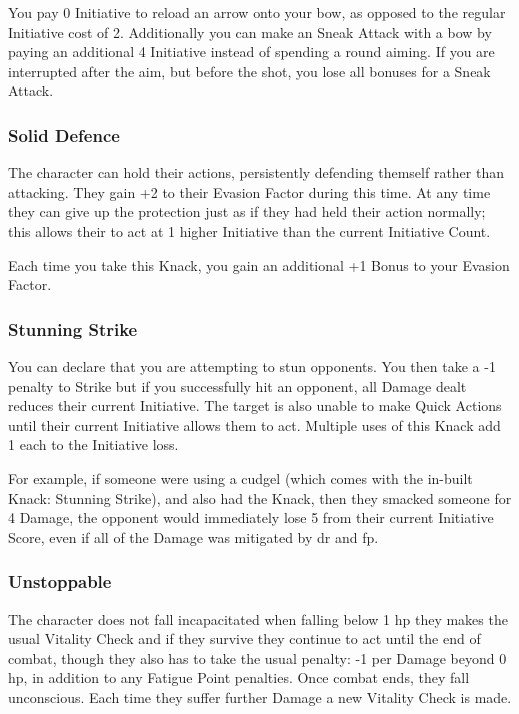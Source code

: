 \begin{multicols}{2}
You pay 0 Initiative to reload an arrow onto your bow, as opposed to the regular Initiative cost of 2.
Additionally you can make an Sneak Attack with a bow by paying an additional 4 Initiative instead of spending a \gls{round} aiming.
If you are interrupted after the aim, but before the shot, you lose all bonuses for a Sneak Attack.

\subsubsection{Solid Defence}\label{soliddefence}

The character can hold their actions, persistently defending themself rather than attacking. They gain +2 to their Evasion Factor during this time. At any time they can give up the protection just as if they had held their action normally; this allows their to act at 1 higher Initiative than the current Initiative Count.

Each time you take this Knack, you gain an additional +1 Bonus to your Evasion Factor.

\subsubsection{Stunning Strike}\label{stunningstrike}

You can declare that you are attempting to stun opponents.
You then take a -1 penalty to Strike but if you successfully hit an opponent, all Damage dealt reduces their current Initiative.
The target is also unable to make Quick Actions until their current Initiative allows them to act.
Multiple uses of this Knack add 1 each to the Initiative loss.

For example, if someone were using a cudgel (which comes with the in-built Knack: Stunning Strike), and also had the Knack, then they smacked someone for 4 Damage, the opponent would immediately lose 5 from their current Initiative Score, even if all of the Damage was mitigated by \gls{dr} and \gls{fp}.

\subsubsection{Unstoppable}

The character does not fall incapacitated when falling below 1 \gls{hp} they makes the usual Vitality Check and if they survive they continue to act until the end of combat, though they also has to take the usual penalty: -1 per Damage beyond 0 \gls{hp}, in addition to any Fatigue Point penalties.
Once combat ends, they fall unconscious.
Each time they suffer further Damage a new Vitality Check is made.


\end{multicols}
